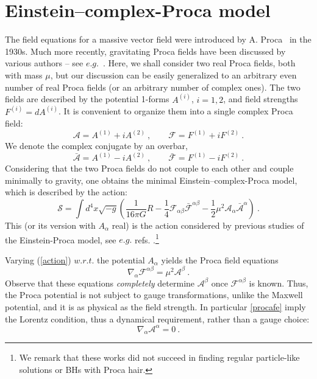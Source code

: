 \documentclass{article}
\numberwithin{equation}{section}
\begin{document}
\section{Einstein--complex-Proca model}
\label{sec_model}
The field equations for a massive vector field were introduced by A. Proca~\cite{Proca} in the 1930s. Much more recently, gravitating Proca fields have been discussed by various authors -- see $e.g.$~\cite{Rosen:1994rq,Obukhov:1999ed,Toussaint:1999zz}. Here, we shall consider  two real Proca fields, both with mass $\mu$, but our discussion can be easily generalized to an arbitrary even number of real Proca fields (or an arbitrary number of complex ones). 
The two fields are described by the potential 1-forms $A^{(i)}$, $i=1,2$, and field strengths $F^{(i)}=dA^{(i)}$. It is convenient to organize them into a single complex Proca field:
\begin{equation}
\mathcal{A}=A^{(1)}+iA^{(2)} \ , \qquad \mathcal{F}=F^{(1)}+iF^{(2)} \ .
\end{equation}
We denote the complex conjugate by an overbar,
\begin{equation}
\bar{\mathcal{A}}=A^{(1)}-iA^{(2)} \ , \qquad \bar{\mathcal{F}}=F^{(1)}-iF^{(2)} \ .
\end{equation}
Considering that the two Proca fields do not couple to each other and couple minimally to gravity, one obtains the minimal Einstein--complex-Proca model, which is  
described by the action:
\begin{equation}
\label{action}
\mathcal{S}=\int d^4x \sqrt{-g}\left(\frac{1}{16 \pi  G}R
-\frac{1}{4}\mathcal{F}_{\alpha\beta}\bar{\mathcal{F}}^{\alpha\beta}
-\frac{1}{2}\mu^2\mathcal{A}_\alpha\bar{\mathcal{A}}^\alpha\right) \ .
\end{equation}
This (or its version with $A_\alpha$ real) 
is the action considered by previous studies of the Einstein-Proca model, see
$e.g.$ refs. \cite{Rosen:1994rq,Vuille:2002qz}.\footnote{We remark that these works did not succeed in finding regular particle-like solutions or BHs with Proca hair.}



Varying  (\ref{action}) $w.r.t.$ the potential $A_\alpha$ yields the Proca field equations
\begin{equation}
\nabla_\alpha\mathcal{F}^{\alpha\beta}=\mu^2 \mathcal{A}^\beta \ .
\label{procafe}
\end{equation}
Observe that these equations \textit{completely} determine $ \mathcal{A}^\beta$ once $\mathcal{F}^{\alpha\beta}$ is known. Thus, the Proca potential is not subject to gauge transformations, unlike the Maxwell potential, and it is as physical as the field strength. In particular \eqref{procafe} imply the Lorentz condition, thus a dynamical requirement, rather than a gauge choice:
\begin{equation}
\nabla_\alpha\mathcal{A}^\alpha = 0 \ .
\label{lorentz}
\end{equation}
\end{document}
